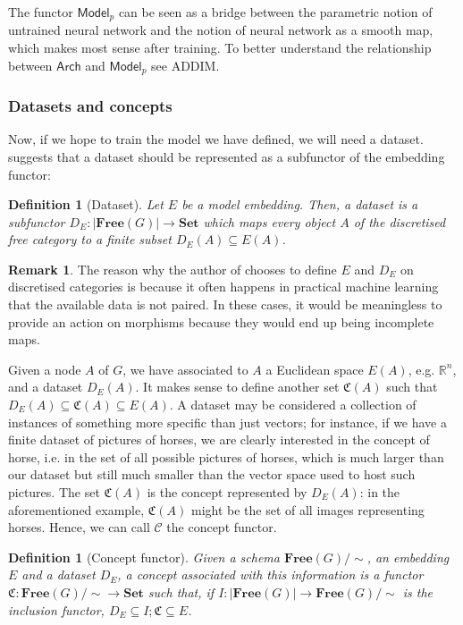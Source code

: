 \documentclass[11pt,a4paper,openright,twoside]{report}
\theoremstyle{plain}
\newtheorem{definition}[proposition]{Definition}
\theoremstyle{definition}
\newtheorem{remark}[proposition]{Remark}
\begin{document}
The functor $\mathsf{Model}_p$ can be seen as a bridge between the parametric notion of untrained neural network and the notion of neural network as a smooth map, which makes most sense after training. To better understand the relationship between $\mathsf{Arch}$ and $\mathsf{Model}_p$ see ADDIM.

\subsubsection{Datasets and concepts}

Now, if we hope to train the model we have defined, we will need a dataset. \cite{gavranovicLearningFunctorsUsing2020} suggests that a dataset should be represented as a subfunctor of the embedding functor:

\begin{definition}[Dataset]
  Let $E$ be a model embedding. Then, a dataset is a subfunctor $D_E: |\mathbf{Free}(G)| \to \mathbf{Set}$ which maps every object $A$ of the discretised free category to a finite subset $D_E(A) \subseteq E(A)$.
\end{definition}

\begin{remark}
  The reason why the author of \cite{gavranovicLearningFunctorsUsing2020} chooses to define $E$ and $D_E$ on discretised categories is because it often happens in practical machine learning that the available data is not paired. In these cases, it would be meaningless to provide an action on morphisms because they would end up being incomplete maps.
\end{remark}

Given a node $A$ of $G$, we have associated to $A$ a Euclidean space $E(A)$, e.g. $\mathbb{R}^n$, and a dataset $D_E(A)$. It makes sense to define another set $\mathfrak{C}(A)$ such that $D_E(A) \subseteq \mathfrak{C}(A) \subseteq E(A)$. A dataset may be considered a collection of instances of something more specific than just vectors; for instance, if we have a finite dataset of pictures of horses, we are clearly interested in the concept of horse, i.e. in the set of all possible pictures of horses, which is much larger than our dataset but still much smaller than the vector space used to host such pictures. The set $\mathfrak{C}(A)$ is the concept represented by $D_E(A)$: in the aforementioned example, $\mathfrak{C}(A)$ might be the set of all images representing horses. Hence, we can call $\mathcal{C}$ the concept functor. 

\begin{definition}[Concept functor]
  Given a schema $\mathbf{Free}(G)/{\sim}$, an embedding $E$ and a dataset $D_E$, a concept associated with this information is a functor $\mathfrak{C}: \mathbf{Free}(G)/{\sim} \to \mathbf{Set}$ such that, if $I: |\mathbf{Free}(G)| \to \mathbf{Free}(G)/{\sim}$ is the inclusion functor, $D_E \subseteq I;\mathfrak{C} \subseteq E$.
\end{definition}
\end{document}
